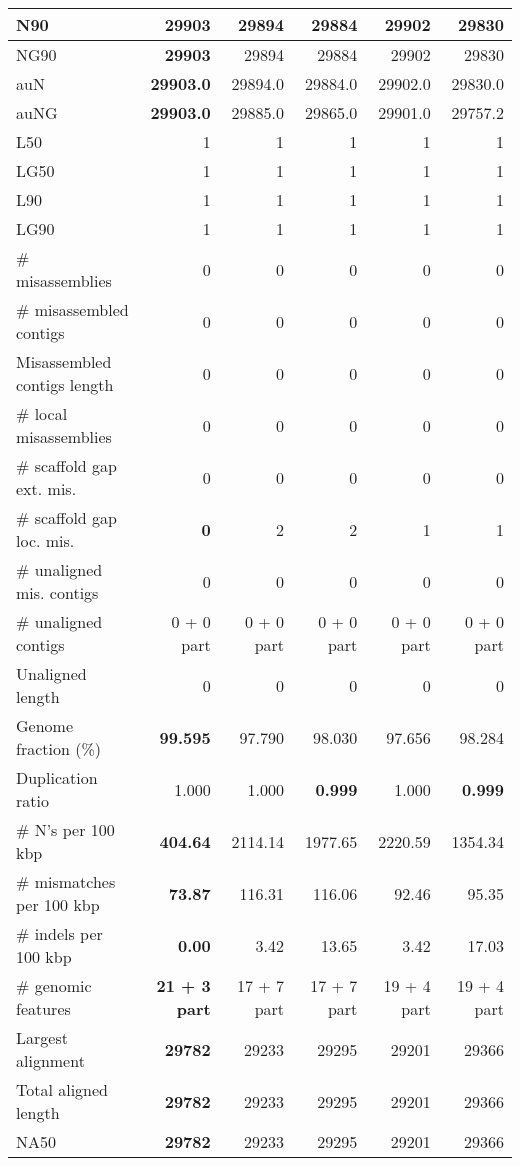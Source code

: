 \documentclass[12pt,a4paper]{article}
\begin{document}
\begin{table}[ht]
\begin{center}
\begin{tabular}{|l*{5}{|r}|}
N90 & {\bf 29903} & 29894 & 29884 & 29902 & 29830 \\ \hline
NG90 & {\bf 29903} & 29894 & 29884 & 29902 & 29830 \\ \hline
auN & {\bf 29903.0} & 29894.0 & 29884.0 & 29902.0 & 29830.0 \\ \hline
auNG & {\bf 29903.0} & 29885.0 & 29865.0 & 29901.0 & 29757.2 \\ \hline
L50 & 1 & 1 & 1 & 1 & 1 \\ \hline
LG50 & 1 & 1 & 1 & 1 & 1 \\ \hline
L90 & 1 & 1 & 1 & 1 & 1 \\ \hline
LG90 & 1 & 1 & 1 & 1 & 1 \\ \hline
\# misassemblies & 0 & 0 & 0 & 0 & 0 \\ \hline
\# misassembled contigs & 0 & 0 & 0 & 0 & 0 \\ \hline
Misassembled contigs length & 0 & 0 & 0 & 0 & 0 \\ \hline
\# local misassemblies & 0 & 0 & 0 & 0 & 0 \\ \hline
\# scaffold gap ext. mis. & 0 & 0 & 0 & 0 & 0 \\ \hline
\# scaffold gap loc. mis. & {\bf 0} & 2 & 2 & 1 & 1 \\ \hline
\# unaligned mis. contigs & 0 & 0 & 0 & 0 & 0 \\ \hline
\# unaligned contigs & 0 + 0 part & 0 + 0 part & 0 + 0 part & 0 + 0 part & 0 + 0 part \\ \hline
Unaligned length & 0 & 0 & 0 & 0 & 0 \\ \hline
Genome fraction (\%) & {\bf 99.595} & 97.790 & 98.030 & 97.656 & 98.284 \\ \hline
Duplication ratio & 1.000 & 1.000 & {\bf 0.999} & 1.000 & {\bf 0.999} \\ \hline
\# N's per 100 kbp & {\bf 404.64} & 2114.14 & 1977.65 & 2220.59 & 1354.34 \\ \hline
\# mismatches per 100 kbp & {\bf 73.87} & 116.31 & 116.06 & 92.46 & 95.35 \\ \hline
\# indels per 100 kbp & {\bf 0.00} & 3.42 & 13.65 & 3.42 & 17.03 \\ \hline
\# genomic features & {\bf 21 + 3 part} & 17 + 7 part & 17 + 7 part & 19 + 4 part & 19 + 4 part \\ \hline
Largest alignment & {\bf 29782} & 29233 & 29295 & 29201 & 29366 \\ \hline
Total aligned length & {\bf 29782} & 29233 & 29295 & 29201 & 29366 \\ \hline
NA50 & {\bf 29782} & 29233 & 29295 & 29201 & 29366 \\ \hline

\end{tabular}
\end{center}
\end{table}
\end{document}
